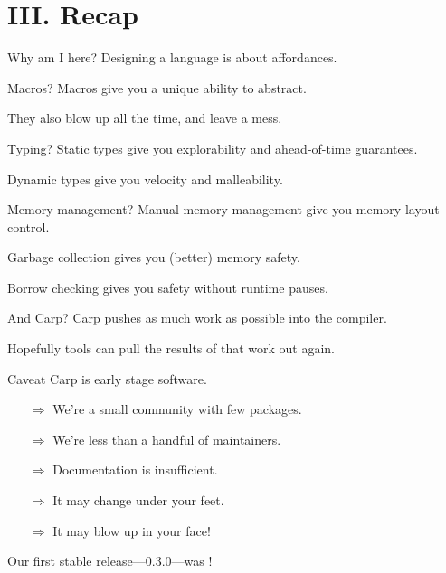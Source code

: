\documentclass[14pt,aspectratio=169]{beamer}
\begin{document}
  \section{III. Recap}
  \begin{frame}{Why am I here?}
    Designing a language is about affordances.
  \end{frame}
  \begin{frame}{Macros?}
    Macros give you a unique ability to abstract.
    \linebreak

    They also blow up all the time, and leave a mess.
  \end{frame}
  \begin{frame}{Typing?}
    Static types give you explorability and ahead-of-time guarantees.
    \linebreak

    Dynamic types give you velocity and malleability.
  \end{frame}
  \begin{frame}{Memory management?}
    Manual memory management give you memory layout control.
    \linebreak

    Garbage collection gives you (better) memory safety.
    \linebreak

    Borrow checking gives you safety without runtime pauses.
  \end{frame}
  \begin{frame}{And Carp?}
    Carp pushes as much work as possible into the compiler. \linebreak

    Hopefully tools can pull the results of that work out again.
  \end{frame}
  \begin{frame}{Caveat}
    Carp is early stage software.
    \begin{itemize}
      \item[$\Rightarrow$] We’re a small community with few packages.
      \item[$\Rightarrow$] We’re less than a handful of maintainers.
      \item[$\Rightarrow$] Documentation is insufficient.
      \item[$\Rightarrow$] It may change under your feet.
      \item[$\Rightarrow$] It may blow up in your face!
    \end{itemize}
    Our first stable release—0.3.0—was !
  \end{frame}
\end{document}
